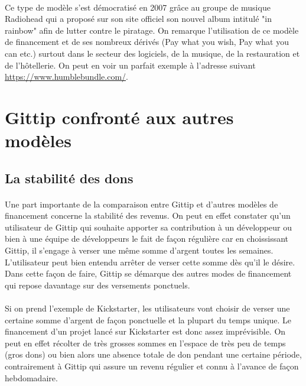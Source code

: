     \paragraph{} Ce type de modèle s'est démocratisé en 2007 grâce au groupe de
    musique Radiohead qui a proposé sur son site officiel son nouvel album
    intitulé "in rainbow" afin de lutter contre le piratage. On remarque
    l'utilisation de ce modèle de financement et de ses nombreux dérivés (Pay
    what you wish, Pay what you can etc.) surtout dans le secteur des
    logiciels, de la musique, de la restauration et de l'hôtellerie. On peut en
    voir un parfait exemple à l'adresse suivant
    \url{https://www.humblebundle.com/}.


\section{Gittip confronté aux autres modèles}

\subsection{La stabilité des dons}

\paragraph{}
Une part importante de la comparaison entre Gittip et d'autres modèles de
financement concerne la stabilité des revenus. On peut en effet constater qu'un
utilisateur de Gittip qui souhaite apporter sa contribution à un développeur ou
bien à une équipe de développeurs le fait de façon régulière car en
choississant
Gittip, il s'engage à verser une même somme d'argent toutes les semaines.
L'utilisateur peut bien entendu arrêter de verser cette somme dès qu'il le
désire. Dans cette façon de faire, Gittip se démarque des autres modes de
financement qui repose davantage sur des versements ponctuels.

\paragraph{}
Si on prend l'exemple de Kickstarter, les utilisateurs vont choisir de verser
une certaine somme d'argent de façon ponctuelle et la plupart du temps unique.
Le financement d'un projet lancé sur Kickstarter est donc assez imprévisible.
On peut en effet récolter de très grosses sommes en l'espace de très peu de
temps
(gros dons) ou bien alors une absence totale de don pendant une certaine
période, contrairement à Gittip qui assure un revenu régulier et connu à
l'avance de façon hebdomadaire.

